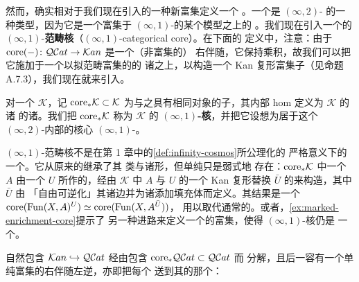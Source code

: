 然而，\trInfinityGroupoidCore{}确实相对于我们现在引入的一种新富集定义一个%
\trSimplicialFunctor。一个\trInfinityCosmos{}是 $(\infty,2)$-\trCategory{}%
的一种类型，因为它是一个富集于 $(\infty,1)$-\trCategory{}的某个模型之上的%
\trCategory。我们现在引入一个\trInfinityCosmos{}的
$(\infty,1)$-\textbf{范畴核}（$(\infty,1)$-categorical core）。在下面的
定义中，注意：由于 $\mathrm{core}(-)\colon\mathcal{Q}\mathcal{C}at\to\mathcal{K}an$ 是一个（非富集的）
右伴随，它保持乘积，故我们可以把它施加于一个以拟范畴富集的\trCategory{}的
诸\trFunctorSpace{}之上，以构造一个 Kan 复形富集子\trCategory{}（见命题
A.7.3），我们现在就来引入。

\begin{definition}\label{def:infinity-one-core-cosmos}
对一个\trInfinityCosmos{} $\mathcal{K}$，记 $\mathrm{core}_{\ast}\mathcal{K}\subset\mathcal{K}$
为与之具有相同对象的子\trCategory，其内部 hom 定义为 $\mathcal{K}$ 的诸%
\trFunctorSpace{}的诸\trInfinityGroupoidCore。我们把 $\mathrm{core}_{\ast}\mathcal{K}$
称为 $\mathcal{K}$ 的 \textbf{$(\infty,1)$-核}，并把它设想为居于这个
$(\infty,2)$-\trCategory{}内部的核心 $(\infty,1)$-\trCategory。
\end{definition}

\begin{remark}\label{rem:core-not-infinity-cosmos}
$(\infty,1)$-范畴核不是在第 1 章中的\cref{def:infinity-cosmos}所公理化的
严格意义下的一个\trInfinityCosmos。它从原来的\trInfinityCosmos{}继承了其%
\trIsofibration{}类与诸\trCone{}形\trLimit{}，但单纯\trCotensor{}只是弱式地
存在：$\mathrm{core}_{\ast}\mathcal{K}$ 中一个\trInfinityCategory{} $A$ 由一个%
\trSimplicialSet{} $U$ 所作的\trCotensor，经由 $\mathcal{K}$ 中 $A$ 与 $U$
的一个 Kan 复形替换 $\bar{U}$ 的\trCotensor{}来构造，其中 $\bar{U}$ 由
「自由可逆化」其诸边并为诸\trHorn{}添加填充体而定义。其结果是一个%
\trEquivalence{}
$\mathrm{core}(\operatorname{Fun}(X,A)^{U})\simeq\mathrm{core}(\operatorname{Fun}(X,A^{\bar{U}}))$，
用以取代通常的\trIsomorphism。或者，\cref{ex:marked-enrichment-core}提示了
另一种进路来定义一个\trInfinityCosmos{}的富集，使得 $(\infty,1)$-核仍是
一个\trInfinityCosmos。
\end{remark}

\begin{lemma}\label{lem:kan-inclusion-factors-through-core}
自然包含 $\mathcal{K}an\hookrightarrow\mathcal{Q}\mathcal{C}at$ 经由包含 $\mathrm{core}_{\ast}\mathcal{Q}\mathcal{C}at\subset\mathcal{Q}\mathcal{C}at$ 而
分解，且后一\trFunctor{}容有一个单纯富集的右伴随左逆，亦即把每个%
\trQuasiCategory{}送到其\trInfinityGroupoidCore{}的那个\trFunctor：
\begin{center}
\end{center}
\end{lemma}

